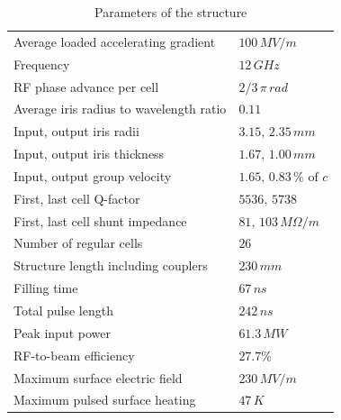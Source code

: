\begin{table}[h]
  \centering
    \begin{tabular}{ l l  }
    \hline
    \hline
    Average loaded accelerating gradient			& $100\, MV/m$	\\
    Frequency								& $12 \, GHz$	\\        
    RF phase advance per cell					& $2/3 \, \pi \, rad$	\\       
    Average iris radius to wavelength ratio			& $0.11$	\\ 
    Input, output iris radii      					& $3.15, \, 2.35 \, mm$	\\
    Input, output iris thickness      				& $1.67, \, 1.00 \, mm$	\\
    Input, output group velocity					& $1.65, \, 0.83 \, \% \text{ of }c $	\\
    First, last cell Q-factor						& $5536,\,5738$\\
    First, last cell shunt impedance				& $81,\,103\, M\Omega / m$\\
    Number of regular cells						& $26$	\\   
    Structure length including couplers			& $230 \,mm$	\\   
    Filling time								& $67 \, ns$	\\               
    Total pulse length							& $242 \, ns$	\\      
    Peak input power 							& $61.3 \, MW$	\\        
    RF-to-beam efficiency						& $27.7 \%$	\\   
    Maximum surface electric field				& $230 \, MV/m$	\\           
    Maximum pulsed surface heating				& $47 \, K$	\\       
    \hline
    \hline
    \end{tabular}
  \caption{Parameters of the structure}
\label{TD26_param_1}
\end{table}

